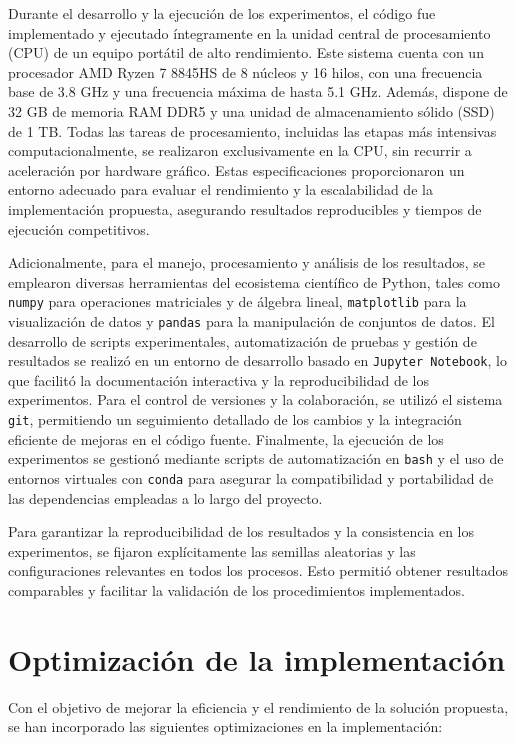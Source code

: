 Durante el desarrollo y la ejecución de los experimentos, el código fue implementado y ejecutado íntegramente en la unidad central de procesamiento (CPU) de un equipo portátil de alto rendimiento. Este sistema cuenta con un procesador AMD Ryzen 7 8845HS de 8 núcleos y 16 hilos, con una frecuencia base de 3.8 GHz y una frecuencia máxima de hasta 5.1 GHz. Además, dispone de 32 GB de memoria RAM DDR5 y una unidad de almacenamiento sólido (SSD) de 1 TB. Todas las tareas de procesamiento, incluidas las etapas más intensivas computacionalmente, se realizaron exclusivamente en la CPU, sin recurrir a aceleración por hardware gráfico. Estas especificaciones proporcionaron un entorno adecuado para evaluar el rendimiento y la escalabilidad de la implementación propuesta, asegurando resultados reproducibles y tiempos de ejecución competitivos.

Adicionalmente, para el manejo, procesamiento y análisis de los resultados, se emplearon diversas herramientas del ecosistema científico de Python, tales como \texttt{numpy} para operaciones matriciales y de álgebra lineal, \texttt{matplotlib} para la visualización de datos y \texttt{pandas} para la manipulación de conjuntos de datos. El desarrollo de scripts experimentales, automatización de pruebas y gestión de resultados se realizó en un entorno de desarrollo basado en \texttt{Jupyter Notebook}, lo que facilitó la documentación interactiva y la reproducibilidad de los experimentos. Para el control de versiones y la colaboración, se utilizó el sistema \texttt{git}, permitiendo un seguimiento detallado de los cambios y la integración eficiente de mejoras en el código fuente. Finalmente, la ejecución de los experimentos se gestionó mediante scripts de automatización en \texttt{bash} y el uso de entornos virtuales con \texttt{conda} para asegurar la compatibilidad y portabilidad de las dependencias empleadas a lo largo del proyecto.

Para garantizar la reproducibilidad de los resultados y la consistencia en los experimentos, se fijaron explícitamente las semillas aleatorias y las configuraciones relevantes en todos los procesos. Esto permitió obtener resultados comparables y facilitar la validación de los procedimientos implementados.

\section{Optimización de la implementación}\label{section:optimization}

Con el objetivo de mejorar la eficiencia y el rendimiento de la solución propuesta, se han incorporado las siguientes optimizaciones en la implementación:

